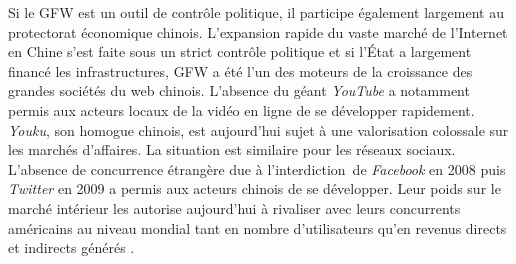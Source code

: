 Si le GFW est un outil de contrôle politique, il participe également largement au protectorat économique chinois. L’expansion rapide du vaste marché de l'Internet en Chine s’est faite sous un strict contrôle politique et si l’État a largement financé les infrastructures, GFW a été l’un des moteurs de la croissance des grandes sociétés du web chinois. L'absence du géant \textit{YouTube} a notamment permis aux acteurs locaux de la vidéo en ligne de se développer rapidement. \textit{Youku}, son homogue chinois, est aujourd’hui sujet à une valorisation colossale sur les marchés d’affaires. La situation est similaire pour les réseaux sociaux. L'absence de concurrence étrangère due à l’interdiction de \textit{Facebook} en 2008 puis \textit{Twitter} en 2009 a permis aux acteurs chinois de se développer. Leur poids sur le marché intérieur les autorise aujourd’hui à rivaliser avec leurs concurrents américains au niveau mondial tant en nombre d’utilisateurs qu’en revenus directs et indirects générés \citep{CIW2012}.

